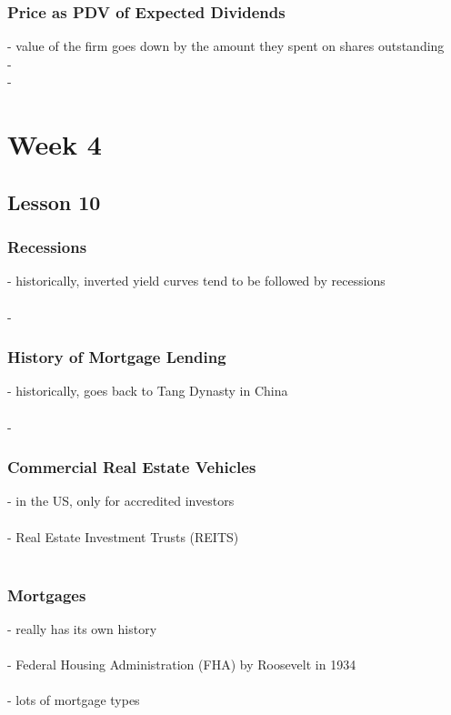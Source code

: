 \documentclass{article} %
\begin{document}
     		\subsubsection*{Price as PDV of Expected Dividends}
     			- value of the firm goes down by the amount they spent on shares outstanding \\
     			- 	
        		  \\
     		-     
 
     \section*{Week 4}
     
     	\subsection*{Lesson 10}
     	
     		\subsubsection*{Recessions}
     		- historically, inverted yield curves tend to be followed by recessions \\
     		\\
     		- 
     	
			\subsubsection*{History of Mortgage Lending}
     		- historically, goes back to Tang Dynasty in China \\ \\
     		-      	
     	
     		\subsubsection*{Commercial Real Estate Vehicles}
     		- in the US, only for accredited investors \\ \\ 
     		-  Real Estate Investment Trusts (REITS) \\ \\
     		
     		\subsubsection*{Mortgages}
     		- really has its own history \\ \\
     		- Federal Housing Administration (FHA) by Roosevelt in 1934 \\ \\
     		- lots of mortgage types
     		
\end{document}
